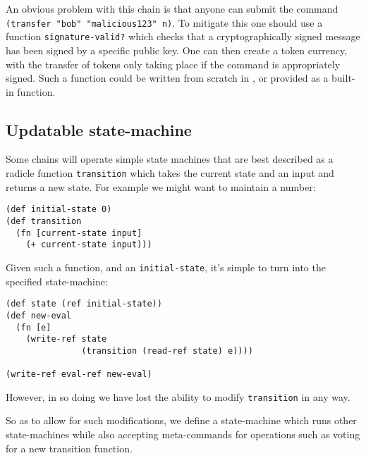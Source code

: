 An obvious problem with this chain is that anyone can submit the command
\texttt{(transfer "bob" "malicious123" n)}. To mitigate this one should use a
function \texttt{signature-valid?} which checks that a cryptographically signed
message has been signed by a specific public key. One can then create a token
currency, with the transfer of tokens only taking place if the command is
appropriately signed. Such a function could be written from scratch in \rad{},
or provided as a built-in function.

\subsection{Updatable state-machine}

Some chains will operate simple state machines that are best described as a
radicle function \texttt{transition} which takes the current state and an input
and returns a new state. For example we might want to maintain a number:
\begin{lstlisting}
(def initial-state 0)
(def transition
  (fn [current-state input]
    (+ current-state input)))
\end{lstlisting}
Given such a function, and an \texttt{initial-state}, it's simple to turn
\rad{} into the specified state-machine:
\begin{lstlisting}
(def state (ref initial-state))
(def new-eval
  (fn [e]
    (write-ref state
               (transition (read-ref state) e))))

(write-ref eval-ref new-eval)
\end{lstlisting}

However, in so doing we have lost the ability to modify \texttt{transition} in
any way.

So as to allow for such modifications, we define a state-machine which runs other
state-machines while also accepting meta-commands for operations such as voting
for a new transition function.

